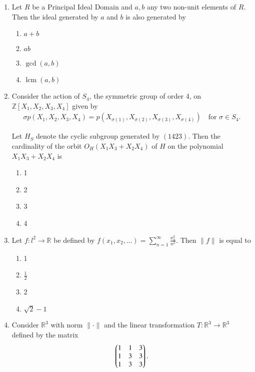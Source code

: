 \documentclass[journal]{IEEEtran}
\numberwithin{equation}{enumi}
\numberwithin{figure}{enumi}
\begin{document}
\begin{enumerate}
\item
Let $R$ be a Principal Ideal Domain and $a, b$ any two non-unit elements of $R$. Then the ideal generated by $a$ and $b$ is also generated by
\hfill{}
\begin{multicols}{4}
\begin{enumerate}
    \item $a + b$
    \item $ab$
    \item $\gcd(a, b)$
    \item $\operatorname{lcm}(a, b)$
\end{enumerate}
\end{multicols}

\item
Consider the action of $S_4$, the symmetric group of order 4, on $\mathbb{Z}[X_1,X_2,X_3,X_4]$ given by
\begin{align}
    \sigma p(X_1,X_2,X_3,X_4) = p(X_{\sigma(1)}, X_{\sigma(2)}, X_{\sigma(3)}, X_{\sigma(4)}) \quad \text{for } \sigma \in S_4.
\end{align}

Let $H_S$ denote the cyclic subgroup generated by $(1423)$. Then the cardinality of the orbit $O_H(X_1X_3 + X_2X_4)$ of $H$ on the polynomial $X_1X_3 + X_2X_4$ is
\hfill{}
\begin{multicols}{4}
\begin{enumerate}
    \item 1
    \item 2
    \item 3
    \item 4
\end{enumerate}
\end{multicols}

\item
Let $f: l^2 \to \mathbb{R}$ be defined by $f(x_1,x_2,\ldots) = \sum_{n=1}^\infty \frac{x_n^2}{n^2}$. Then $\| f \|$ is equal to
\hfill{}
\begin{multicols}{4}
\begin{enumerate}
    \item 1
    \item $\frac{1}{2}$
    \item 2
    \item $\sqrt{2} - 1$
\end{enumerate}
\end{multicols}

\item
Consider $\mathbb{R}^3$ with norm $\|\cdot\|$ and the linear transformation $T : \mathbb{R}^3 \to \mathbb{R}^3$ defined by the matrix
\begin{align}
    \begin{pmatrix}1 & 1 & 3 \\ 1 & 3 & 3 \\ 1 & 3 & 3\end{pmatrix}.
\end{align}


\end{enumerate}
\end{document}
